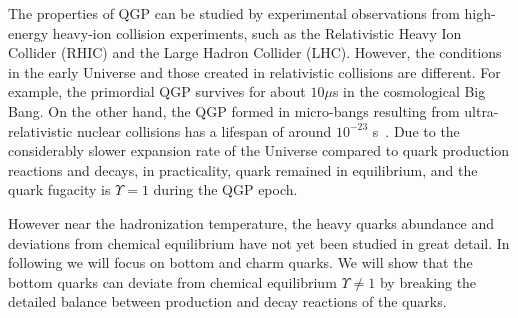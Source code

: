 The properties of QGP can be studied by experimental observations from high-energy heavy-ion collision experiments, such as  the Relativistic Heavy Ion Collider (RHIC) and the Large Hadron Collider (LHC). However, the conditions in the early Universe and those created in relativistic collisions are different. For example, the primordial QGP survives for about $10\mu$s in the cosmological Big Bang. On the other hand, the QGP formed in micro-bangs resulting from ultra-relativistic nuclear collisions has a lifespan of around  $10^{-23}$ s~\cite{Rafelski:2001hp}. Due to the considerably slower expansion rate of the Universe compared to quark production reactions and decays, in practicality, quark remained in equilibrium, and the quark fugacity is $\Upsilon=1$ during the QGP epoch.


However near the hadronization temperature, the heavy quarks abundance and deviations from chemical equilibrium have not yet been studied in great detail. In following we will focus on bottom and charm quarks. We will show that the bottom quarks can deviate from chemical equilibrium $\Upsilon\neq1$ by breaking the detailed balance between production and decay reactions of the quarks.



